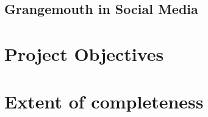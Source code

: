 \subsection{Grangemouth in Social Media}
\label{subsec:media}

\section{Project Objectives}
\label{sec:objectives}

\section{Extent of completeness}
\label{sec:completeness}



